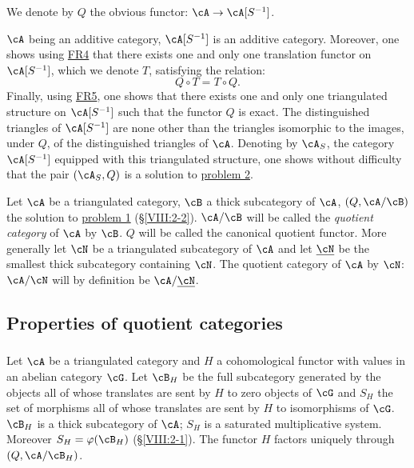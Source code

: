We denote by $Q$ the obvious functor: $\cA\to \cA[S^{-1}]$.

$\cA$ being an additive category, $\cA[S^{-1}]$ is an additive
category. Moreover, one shows using \hyperlink{VIII:FR4}{FR4} that there
exists one and only one translation functor on $\cA[S^{-1}]$, which we
denote $T$, satisfying the relation:
\[
  Q\circ T = T\circ Q \text{.}
\]
Finally, using \hyperlink{VIII:FR5}{FR5}, one shows that there exists one
and only one triangulated structure on $\cA[S^{-1}]$ such that the functor $Q$
is exact. The distinguished triangles of $\cA[S^{-1}]$ are none other than the
triangles isomorphic to the images, under $Q$, of the distinguished triangles of $\cA$.
Denoting by $\cA_S$, the category $\cA[S^{-1}]$ equipped with this
triangulated structure, one shows without difficulty that the pair
$(\cA_S,Q)$ is a solution to \hyperlink{VIII:prob2}{problem 2}. 





\begin{definition}\label{VIII:2-3-3}
Let $\cA$ be a triangulated category, $\cB$ a thick subcategory
of $\cA$, $(Q,\cA/\cB)$ the solution to \hyperlink{VIII:prob1}{problem 1}
(\S \ref{VIII:2-2}). $\cA/\cB$ will be called the \emph{quotient category} of
$\cA$ by $\cB$. $Q$ will be called the canonical quotient
functor. More generally let $\cN$ be a triangulated subcategory of
$\cA$ and let $\underline\cN$ be the smallest thick subcategory
containing $\cN$. The quotient category of $\cA$ by $\cN$: $\cA/\cN$ will by
definition be $\cA/\underline\cN$. 
\end{definition}










\subsection{Properties of quotient categories}\label{VIII:2-4}





\subsubsection{}\label{VIII:2-4-1}

Let $\cA$ be a triangulated category and $H$ a cohomological functor with
values in an abelian category $\cG$. Let $\cB_H$ be the
full subcategory generated by the objects all of whose translates
are sent by $H$ to zero objects of $\cG$ and $S_H$ the set of
morphisms all of whose translates are sent by $H$ to
isomorphisms of $\cG$. $\cB_H$ is a thick subcategory of $\cA$;
$S_H$ is a saturated multiplicative system. Moreover $S_H=\varphi(\cB_H)$
(\S \ref{VIII:2-1}). The functor $H$ factors uniquely through
$(Q,\cA/\cB_H)$. 





